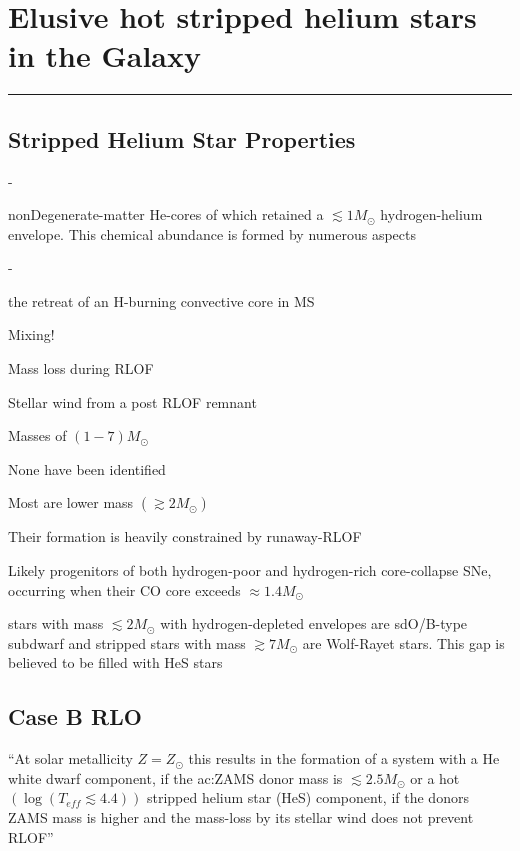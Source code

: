 \documentclass[../../mainNotes.tex]{subfiles}
\begin{document}
\fi

\chapter{Elusive hot stripped helium stars in the Galaxy \cite{yungelsonElusiveHotStripped2024}}
\hrule
\vspace{.5cm}

\section{Stripped Helium Star Properties}

\begin{list}{-}{}
\item non\gls{Degenerate-matter} He-cores of which retained a \(\lesssim 1 M_\odot\) hydrogen-helium envelope.  This chemical abundance is formed by numerous aspects
\begin{list}{-}{}
\item the retreat of an H-burning convective core in MS 
\item Mixing! 
\item Mass loss during RLOF 
\item Stellar wind from a post RLOF remnant
\end{list}
\item Masses of \((1-7)M_\odot\)
\item None have been identified 
\item Most are lower mass \((\gtrsim 2M_\odot)\)
\item Their formation is heavily constrained by \gls{runaway-RLOF} 
\item Likely progenitors of both hydrogen-poor and hydrogen-rich core-collapse SNe, occurring when their CO core exceeds \(\approx 1.4 M_\odot\)
\item stars with mass \(\lesssim 2M_\odot\) with hydrogen-depleted envelopes are sdO/B-type subdwarf and stripped stars with mass \(\gtrsim 7M_\odot\) are Wolf-Rayet stars. This gap is believed to be filled with HeS stars 
\item 
\end{list}

\section{Case B RLO}\label{Yungelson-case-b-rlo}
``At solar metallicity \(Z = Z_\odot\) this results in the formation of a system with a He white dwarf component, if the \gls{ac:ZAMS} donor mass is \(\lesssim 2.5 M_\odot\) or a hot \((\log(T_{eff} \lesssim 4.4))\) stripped helium star (HeS) component, if the donors ZAMS mass is higher and the mass-loss by its stellar wind does not prevent RLOF'' 

\ifdefined\AnMainDocument\else
\end{document}
